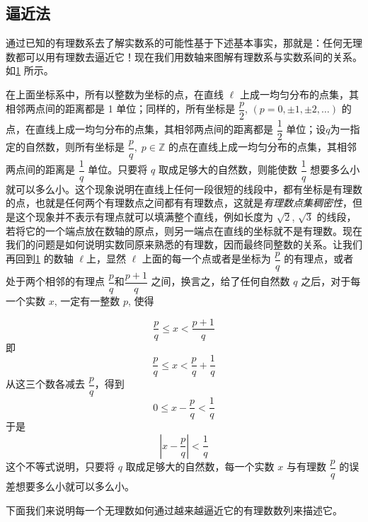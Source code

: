 \subsection{逼近法}
通过已知的有理数系去了解实数系的可能性基于下述基本事实，那就是：任何无理数都可以用有理数去逼近它！现在我们用数轴来图解有理数系与实数系间的关系。如\cref{fig:approximation} 所示。

\begin{figure}
    \caption{}\label{fig:approximation}
\end{figure}

{\linespread{1.6}\selectfont
在上面坐标系中，所有以整数为坐标的点，在直线 $\ell$ 上成一均匀分布的点集，其相邻两点间的距离都是 1 单位；同样的，所有坐标是 $\dfrac{p}{2}$, $(p=0,\pm1,\pm2,\ldots)$ 的点，在直线上成一均匀分布的点集，其相邻两点间的距离都是 $\dfrac{1}{2}$ 单位；设$q$为一指定的自然数，则所有坐标是 $\dfrac{p}{q},\; p\in\mathbb{Z}$ 的点在直线上成一均匀分布的点集，其相邻两点间的距离是 $\dfrac{1}{q}$ 单位。只要将 $q$ 取成足够大的自然数，则能使数 $\dfrac{1}{q}$ 想要多么小就可以多么小。这个现象说明在直线上任何一段很短的线段中，都有坐标是有理数的点，也就是任何两个有理数点之间都有有理数点，这就是\emph{有理数点集稠密性}，但是这个现象并不表示有理点就可以填满整个直线，例如长度为 $\sqrt{2}$, $\sqrt{3}$ 的线段，若将它的一个端点放在数轴的原点，则另一端点在直线的坐标就不是有理数。现在我们的问题是如何说明实数同原来熟悉的有理数，因而最终同整数的关系。让我们再回到\cref{fig:approximation} 的数轴 $\ell$上，显然 $\ell$ 上面的每一个点或者是坐标为 $\dfrac{p}{q}$ 的有理点，或者处于两个相邻的有理点 $\dfrac{p}{q}$和$\dfrac{p+1}{q}$ 之间，换言之，给了任何自然数 $q$ 之后，对于每一个实数 $x$, 一定有一整数  $p$, 使得\par}
\[\frac{p}{q}\leqslant x<\frac{p+1}{q}\]
即
\[\frac{p}{q}\leqslant x<\frac{p}{q}+\frac{1}{q}\]
从这三个数各减去 $\dfrac{p}{q}$，得到
\[0\leqslant x-\frac{p}{q}<\frac{1}{q}\]
于是
\[\left|x-\frac{p}{q}\right|<\frac{1}{q}\]
这个不等式说明，只要将 $q$ 取成足够大的自然数，每一个实数 $x$ 与有理数 $\dfrac{p}{q}$ 的误差想要多么小就可以多么小。

下面我们来说明每一个无理数如何通过越来越逼近它的有理数数列来描述它。

